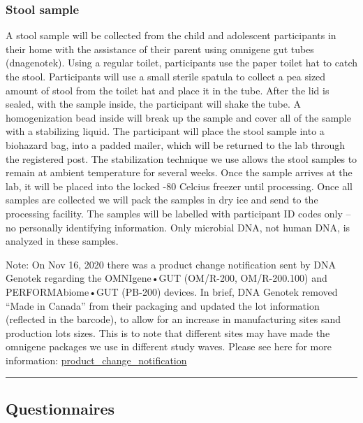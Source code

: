 \documentclass[
]{book}
\begin{document}
\hypertarget{stool-sample}{%
\subsubsection{Stool sample}\label{stool-sample}}

A stool sample will be collected from the child and adolescent participants in their home with the assistance of their parent using omnigene gut tubes (dnagenotek). Using a regular toilet, participants use the paper toilet hat to catch the stool. Participants will use a small sterile spatula to collect a pea sized amount of stool from the toilet hat and place it in the tube. After the lid is sealed, with the sample inside, the participant will shake the tube. A homogenization bead inside will break up the sample and cover all of the sample with a stabilizing liquid. The participant will place the stool sample into a biohazard bag, into a padded mailer, which will be returned to the lab through the registered post. The stabilization technique we use allows the stool samples to remain at ambient temperature for several weeks. Once the sample arrives at the lab, it will be placed into the locked -80 Celcius freezer until processing. Once all samples are collected we will pack the samples in dry ice and send to the processing facility. The samples will be labelled with participant ID codes only -- no personally identifying information. Only microbial DNA, not human DNA, is analyzed in these samples.

Note: On Nov 16, 2020 there was a product change notification sent by DNA Genotek regarding the OMNIgene•GUT (OM/R-200, OM/R-200.100) and PERFORMAbiome•GUT (PB-200) devices. In brief, DNA Genotek removed ``Made in Canada'' from their packaging and updated the lot information (reflected in the barcode), to allow for an increase in manufacturing sites sand production lots sizes. This is to note that different sites may have made the omnigene packages we use in different study waves. Please see here for more information: \href{https://ucla.app.box.com/file/748332038901}{product\_change\_notification}

\begin{center}\rule{0.5\linewidth}{0.5pt}\end{center}

\hypertarget{questionnaires}{%
\subsection{Questionnaires}\label{questionnaires}}
\end{document}
